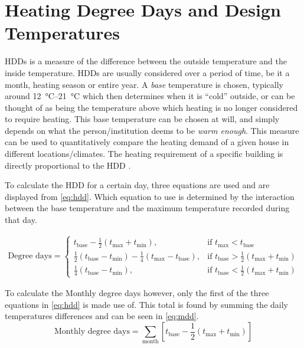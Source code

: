 \section{Heating Degree Days and Design Temperatures} \label{sec:hddanddesign}
\acp{HDD} is a measure of the difference between the outside temperature and the inside temperature. \acp{HDD} are usually considered over a period of time, be it a month, heating season or entire year. A \textit{base} temperature is chosen, typically around \qtyrange{12}{21}{\celsius} which then determines when it is ``cold'' outside, or can be thought of as being the temperature above which heating is no longer considered to require heating. This base temperature can be chosen at will, and simply depends on what the person/institution deems to be \textit{warm enough}. This measure can be used to quantitatively compare the heating demand of a given house in different locations/climates. The heating requirement of a specific building is directly proportional to the \ac{HDD} \cite{chartered_institution_of_building_services_engineers_environmental_2006}.

To calculate  the \ac{HDD} for a certain day, three equations are used and are displayed from \cref{eq:hdd}. Which equation to use is determined by the interaction between the base temperature and the maximum temperature recorded during that day.  

\begin{align}\label{eq:hdd}
    \text{Degree days} = \begin{cases}
        t_\text{base} - \frac12(t_\text{max} + t_\text{min}), & \text{if } t_\text{max} < t_\text{base}\\
        \frac12(t_\text{base} - t_\text{min}) -\frac14(t_\text{max} -t_\text{base} ), & \text{if } t_\text{base} > \frac12(t_\text{max} + t_\text{min}) \\
        \frac14(t_\text{base} -t_\text{min} ), & \text{if } t_\text{base} <\frac12(t_\text{max} + t_\text{min})
     \end{cases}  
\end{align}

To calculate the Monthly degree days however, only the first of the three equations in \cref{eq:hdd} is made use of. This total is found by summing the daily temperatures differences and can be seen in \cref{eq:mdd}.
\begin{equation}
    \text{Monthly degree days} = \displaystyle\sum_\text{month} \left[t_\text{base} - \frac12(t_\text{max} + t_\text{min})\right] \label{eq:mdd}
\end{equation}

